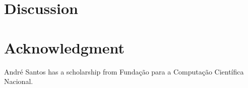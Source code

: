 \documentclass[conference]{IEEEtran}
\begin{document}
\section{Discussion}


\section*{Acknowledgment}

André Santos has a scholarship from Fundação para a
Computação Científica Nacional.



\end{document}
